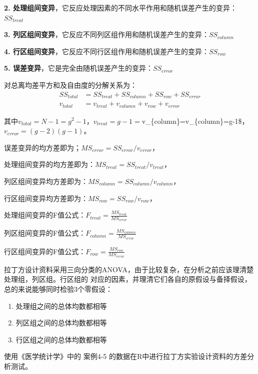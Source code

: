 \documentclass[
]{article}
\begin{document}
\textbf{2. 处理组间变异}，它反应处理因素的不同水平作用和随机误差产生的变异：\(SS_{treat}\)

\textbf{3. 列区组间变异}，它反应不同列区组作用和随机误差产生的变异：\(SS_{column}\)

\textbf{4. 行区组间变异}，它反应不同行区组作用和随机误差产生的变异：\(SS_{row}\)

\textbf{5. 误差变异}，它是完全由随机误差产生的变异：\(SS_{error}\)

对总离均差平方和及自由度的分解关系为：
\[\begin{aligned}
SS_{total} &= SS_{treat}+SS_{column}+SS_{row}+SS_{error}\\
v_{total} &= v_{treat}+v_{column}+v_{row}+v_{error}
\end{aligned}\]

其中\(v_{total}=N-1=g^2-1\)，\(v_{treat}=g-1=\)v\_\{column\}=v\_\{column\}=g-1\$，
\(v_{error}=(g-2)(g-1)\)。

误差变异的均方差即为；\(MS_{error}=SS_{error}/v_{error}\)，

处理组间变异的均方差即为：\(MS_{treat}=SS_{treat}/v_{treat}\)，

列区组间变异均方差即为：\(MS_{column}=SS_{column}/v_{column}\)，

行区组间变异均方差即为：\(MS_{row}=SS_{row}/v_{row}\)，

处理组间变异的F值公式：\(F_{treat}=\frac{MS_{treat}}{MS_{error}}\)

列区组间变异的F值公式：\(F_{column}=\frac{MS_{column}}{MS_{error}}\)

行区组间变异的F值公式：\(F_{row}=\frac{MS_{row}}{MS_{error}}\)

拉丁方设计资料采用三向分类的ANOVA，由于比较复杂，在分析之前应该理清楚处理组，列区组。行区组的
对应的因素，并理清它们各自的原假设与备择假设，总的来说能够同时检验3个零假设：

\begin{enumerate}
\def\labelenumi{\arabic{enumi}.}
\item
  处理组之间的总体均数都相等
\item
  列区组之间的总体均数都相等
\item
  行区组之间的总体均数都相等
\end{enumerate}

使用《医学统计学》中的 案例4-5 的数据在R中进行拉丁方实验设计资料的方差分析测试。
\end{document}
